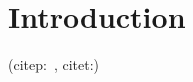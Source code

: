 \chapter{Introduction}\label{ch:introduction}


\lipsum[1]

(citep:~\citep{knuth:1974}, citet:\citet{knuth:1974})
